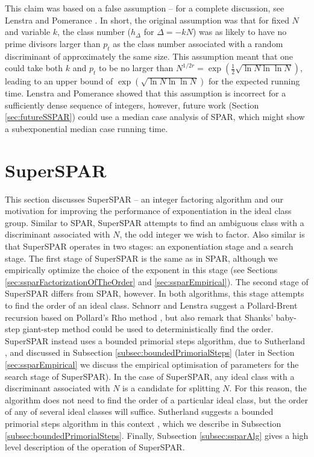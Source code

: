 \documentclass{ucalgthes1}
\theoremstyle{definition}
\begin{document}
This claim was based on a false assumption -- for a complete discussion, see Lenstra and Pomerance \cite[\S~11]{Lenstra1992}.  In short, the original assumption was that for fixed $N$ and variable $k$, the class number ($h_\Delta$ for $\Delta = -kN$) was as likely to have no prime divisors larger than $p_t$ as the class number associated with a random discriminant of approximately the same size.  This assumption meant that one could take both $k$ and $p_t$ to be no larger than $N^{1/2r} = \exp\left(\frac{1}{2}\sqrt{\ln N \ln \ln N}\right)$, leading to an upper bound of $\exp\left(\sqrt{\ln N \ln \ln N}\right)$ for the expected running time.  Lenstra and Pomerance showed \cite[\S 11]{Lenstra1992} that this assumption is incorrect for a sufficiently dense sequence of integers, however, future work (Section \ref{sec:futureSSPAR}) could use a median case analysis of SPAR, which might show a subexponential median case running time.


\section{SuperSPAR}
\label{sec:superSpar}

This section discusses SuperSPAR -- an integer factoring algorithm and our motivation for improving the performance of exponentiation in the ideal class group.  Similar to SPAR, SuperSPAR attempts to find an ambiguous class with a discriminant associated with $N$, the odd integer we wish to factor.  Also similar is that SuperSPAR operates in two stages: an exponentiation stage and a search stage.  The first stage of SuperSPAR is the same as in SPAR, although we empirically optimize the choice of the exponent in this stage (see Sections \ref{sec:ssparFactorizationOfTheOrder} and \ref{sec:ssparEmpirical}).  The second stage of SuperSPAR differs from SPAR, however.  In both algorithms, this stage attempts to find the order of an ideal class.  Schnorr and Lenstra \mbox{\cite[p.294]{Schnorr1984}} suggest a Pollard-Brent recursion \cite{Brent1980} based on Pollard's Rho method \cite{Pollard1975}, but also remark \cite[p.298]{Schnorr1984} that Shanks' baby-step giant-step method \cite{Shanks1971} could be used to deterministically find the order.  SuperSPAR instead uses a bounded primorial steps algorithm, due to Sutherland \cite[\S 4.1]{Sutherland2007}, and discussed in Subsection \ref{subsec:boundedPrimorialSteps} (later in Section \ref{sec:ssparEmpirical} we discuss the empirical optimisation of parameters for the search stage of SuperSPAR).  In the case of SuperSPAR, any ideal class with a discriminant associated with $N$ is a candidate for splitting $N$.  For this reason, the algorithm does not need to find the order of a particular ideal class, but the order of any of several ideal classes will suffice.  Sutherland suggests a bounded primorial steps algorithm in this context \cite[\S 5.4]{Sutherland2007}, which we describe in Subsection \ref{subsec:boundedPrimorialSteps}.  Finally, Subsection \ref{subsec:ssparAlg} gives a high level description of the operation of SuperSPAR.
\end{document}
